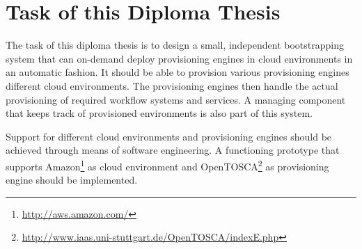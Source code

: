 \section{Task of this Diploma Thesis}

The task of this diploma thesis is to design a small, independent bootstrapping system that can on-demand deploy provisioning engines in cloud environments in an automatic fashion.
It should be able to provision various provisioning engines different cloud environments.
The provisioning engines then handle the actual provisioning of required workflow systems and services.
A managing component that keeps track of provisioned environments is also part of this system.

Support for different cloud environments and provisioning engines should be achieved through means of software engineering.
A functioning prototype that supports Amazon\footnote{\url{http://aws.amazon.com/}} as cloud environment and OpenTOSCA\footnote{\url{http://www.iaas.uni-stuttgart.de/OpenTOSCA/indexE.php}} as provisioning engine should be implemented.
